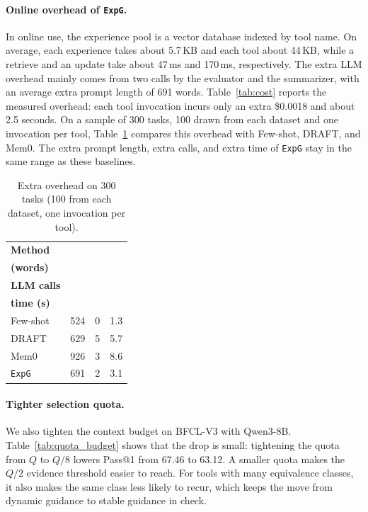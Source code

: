 \documentclass[11pt]{article}
\newcommand{\ours}{\texttt{ExpG}}
\begin{document}
\paragraph{Online overhead of {\ours}.}
In online use, the experience pool is a vector database indexed by tool name.
On average, each experience takes about 5.7\,KB and each tool about 44\,KB, while a retrieve and an update take about 47\,ms and 170\,ms, respectively.
The extra LLM overhead mainly comes from two calls by the evaluator and the summarizer, with an average extra prompt length of 691 words.
Table~\ref{tab:cost} reports the measured overhead: each tool invocation incurs only an extra \$0.0018 and about 2.5 seconds.
On a sample of 300 tasks, 100 drawn from each dataset and one invocation per tool, Table~\ref{tab:overhead_cmp} compares this overhead with Few-shot, DRAFT, and Mem0. The extra prompt length, extra calls, and extra time of {\ours} stay in the same range as these baselines.

\begin{table}[t]
\caption{Extra overhead on 300 tasks (100 from each dataset, one invocation per tool).}
\vspace{-1mm}
\centering
\fontsize{8}{9}\selectfont
\setlength{\tabcolsep}{1.5pt}
\begin{tabular*}{\columnwidth}{@{\extracolsep{\fill}}lccc@{}}
\toprule
\textbf{Method} & \begin{tabular}[c]{@{}c@{}}\textbf{Prompt length}\\\textbf{(words)}\end{tabular} & \begin{tabular}[c]{@{}c@{}}\textbf{Extra}\\\textbf{LLM calls}\end{tabular} & \begin{tabular}[c]{@{}c@{}}\textbf{Extra}\\\textbf{time (s)}\end{tabular} \\
\midrule
Few-shot & 524 & 0 & 1.3 \\
DRAFT & 629 & 5 & 5.7 \\
Mem0 & 926 & 3 & 8.6 \\
{\ours} & 691 & 2 & 3.1 \\
\bottomrule
\end{tabular*}
\label{tab:overhead_cmp}
\end{table}

\paragraph{Tighter selection quota.}
We also tighten the context budget on BFCL-V3 with Qwen3-8B. Table~\ref{tab:quota_budget} shows that the drop is small: tightening the quota from $Q$ to $Q/8$ lowers Pass@1 from 67.46 to 63.12. A smaller quota makes the $Q/2$ evidence threshold easier to reach. For tools with many equivalence classes, it also makes the same class less likely to recur, which keeps the move from dynamic guidance to stable guidance in check.
\end{document}
